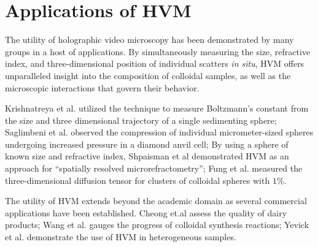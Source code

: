 \section{Applications of HVM}

The utility of holographic video microscopy has been demonstrated by many groups
in a host of applications. By simultaneously measuring the size, refractive index,
and three-dimensional position of individual scatters {\it in situ}, HVM
offers unparalleled insight into the composition of colloidal samples, as well
as the microscopic interactions that govern their behavior.

Krishnatreya et al. utilized the technique to measure Boltzmann's constant from the
size and three dimensional trajectory of a single sedimenting sphere;
Saglimbeni et al. observed the compression of individual micrometer-sized
spheres
undergoing increased pressure in a diamond anvil cell; By using a sphere
of known size and refractive index, Shpaisman et al demonstrated HVM as an
approach for ``spatially resolved microrefractometry''; Fung et al. measured
the three-dimensional diffusion tensor for clusters of colloidal spheres
with $\num{1}$\%.

The utility of HVM extends beyond the academic domain as several commercial
applications have been established. Cheong et.al assess the quality of dairy
products; Wang et al. gauges the progress of colloidal synthesis reactions;
Yevick et al. demonstrate the use of HVM in heterogeneous samples.
